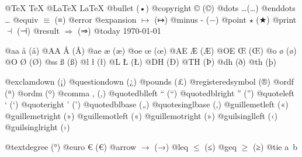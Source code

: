 \documentclass{book}
\renewcommand{\_}{\Texinfounderscore\discretionary{}{}{}}
\begin{document}
\begin{titlepage}
@TeX \TeX{}
@LaTeX \LaTeX{}
@bullet \textbullet{} (•)
@copyright \copyright{} (©)
@dots \dots{}\@ (…)
@enddots \dots{}
@equiv $\equiv{}$ (≡)
@error 
@expansion $\mapsto{}$ (↦)
@minus - (−)
@point $\star{}$ (★)
@print $\dashv{}$ (⊣)
@result $\Rightarrow{}$ (⇒)
@today \today{}

@aa \aa{} (å)
@AA \AA{} (Å)
@ae \ae{} (æ)
@oe \oe{} (œ)
@AE \AE{} (Æ)
@OE \OE{} (Œ)
@o \o{} (ø)
@O \O{} (Ø)
@ss \ss{} (ß)
@l \l{} (ł)
@L \L{} (Ł)
@DH \DH{} (Ð)
@TH \TH{} (Þ)
@dh \dh{} (ð)
@th \th{} (þ)

@exclamdown \textexclamdown{} (¡)
@questiondown \textquestiondown{} (¿)
@pounds \textsterling{} (£)
@registeredsymbol \circledR{} (®)
@ordf \textordfeminine{} (ª)
@ordm \textordmasculine{} (º)
@comma , (,)
@quotedblleft \textquotedblleft{} (“)
@quotedblright \textquotedblright{} (”)
@quoteleft \textquoteleft{} (‘)
@quoteright \textquoteright{} (’)
@quotedblbase \quotedblbase{} („)
@quotesinglbase \quotesinglbase{} (‚)
@guillemetleft \guillemotleft{} («)
@guillemetright \guillemotright{} (»)
@guillemotleft \guillemotleft{} («)
@guillemotright \guillemotright{} (»)
@guilsinglleft \guilsinglleft{} (‹)
@guilsinglright \guilsinglright{} (›)

@textdegree \textdegree{} (°)
@euro \euro{} (€)
@arrow $\rightarrow{}$ (→)
@leq $\leq{}$ (≤)
@geq $\geq{}$ (≥)
@tie a~b


\end{titlepage}
\end{document}
